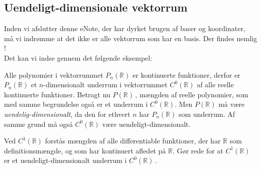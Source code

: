 \subsection{Uendeligt-dimensionale vektorrum}

Inden vi afslutter denne eNote, der har dyrket brugen af baser og koordinater, må vi indrømme at det ikke er alle vektorrum som har en basis. Der findes nemlig !
\medskip\\
Det kan vi indse gennem det følgende eksempel:
\begin{example}\label{tn7.uendeligDim}
Alle polynomier i vektorrummet $P_n(\mathbb R)$ er kontinuerte funktioner, derfor er $P_n(\mathbb R)$ et $n$-dimensionalt underrum i vektorrummet $C^0(\mathbb R)$ af alle reelle kontinuerte funktioner. Betragt nu $P(\mathbb R)\,$, mængden af reelle polynomier, som med samme begrundelse også er et underrum i $C^0(\mathbb R)$. Men $P(\mathbb R)$ må være \textit{uendelig-dimensionalt}, da den for ethvert $n$ har $P_n(\mathbb R)$ som underrum. Af samme grund må også $C^0(\mathbb R)$ være uendeligt-dimensionalt.
\end{example}
\begin{exercise}
Ved $C^1(\mathbb R)$ forstås mængden af alle differentiable funktioner, der har $\mathbb R$ som definitionsmængde, og som har kontinuert afledet på $\mathbb R$. \bs
Gør rede for at $C^1(\mathbb R)$ er et uendeligt-dimensionalt underrum i $C^0(\mathbb R)\,$.
\end{exercise}






